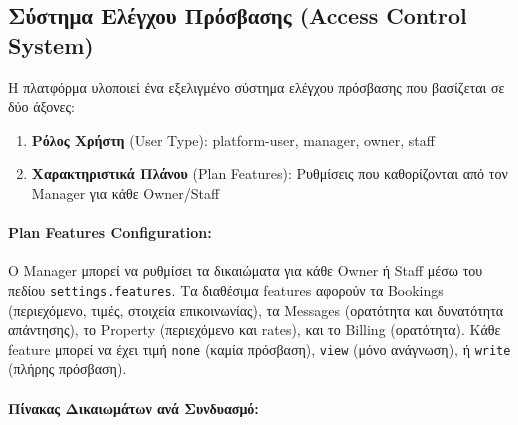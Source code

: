 \documentclass[
	12pt, %
	oneside, %
	greek,
	onehalfspacing, %
	liststotoc, %
	toctotoc, %
	parskip, %
	headsepline, %
]{MastersDoctoralThesis} %
\newcommand{\code}[1]{\texttt{#1}}
\begin{document}
\subsection{Σύστημα Ελέγχου Πρόσβασης (Access Control System)}
\label{subsec:access-control}

Η πλατφόρμα υλοποιεί ένα εξελιγμένο σύστημα ελέγχου πρόσβασης που βασίζεται σε δύο άξονες:

\begin{enumerate}
    \item \textbf{Ρόλος Χρήστη} (User Type): platform-user, manager, owner, staff
    \item \textbf{Χαρακτηριστικά Πλάνου} (Plan Features): Ρυθμίσεις που καθορίζονται από τον Manager για κάθε Owner/Staff
\end{enumerate}

\paragraph{Plan Features Configuration:}

Ο Manager μπορεί να ρυθμίσει τα δικαιώματα για κάθε Owner ή Staff μέσω του πεδίου \code{settings.features}. Τα διαθέσιμα features αφορούν τα Bookings (περιεχόμενο, τιμές, στοιχεία επικοινωνίας), τα Messages (ορατότητα και δυνατότητα απάντησης), το Property (περιεχόμενο και rates), και το Billing (ορατότητα). Κάθε feature μπορεί να έχει τιμή \code{none} (καμία πρόσβαση), \code{view} (μόνο ανάγνωση), ή \code{write} (πλήρης πρόσβαση).

\paragraph{Πίνακας Δικαιωμάτων ανά Συνδυασμό:}

\begin{table}[H]
\centering
\caption{Πίνακας Δικαιωμάτων}
\label{tab:permissions-matrix}
\end{table}
\end{document}
